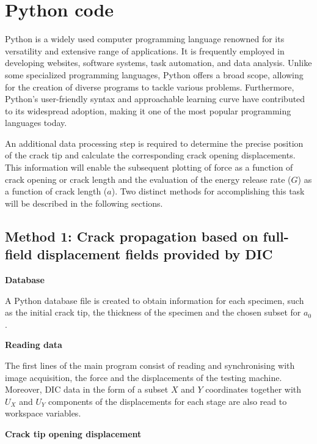 \section{Python code}

Python is a widely used computer programming language renowned for its versatility and extensive range of applications. It is frequently employed in developing websites, software systems, task automation, and data analysis. Unlike some specialized programming languages, Python offers a broad scope, allowing for the creation of diverse programs to tackle various problems. Furthermore, Python's user-friendly syntax and approachable learning curve have contributed to its widespread adoption, making it one of the most popular programming languages today.

An additional data processing step is required to determine the precise position of the crack tip and calculate the corresponding crack opening displacements. This information will enable the subsequent plotting of force as a function of crack opening or crack length and the evaluation of the energy release rate ($G$) as a function of crack length ($a$). Two distinct methods for accomplishing this task will be described in the following sections.

\subsection{Method 1: Crack propagation based on full-field displacement fields provided by DIC}

\textbf{Database}

A Python database file is created to obtain information for each specimen, such as the initial crack tip, the thickness of the specimen and the chosen subset for $a_0$.

\textbf{Reading data}

The first lines of the main program consist of reading and synchronising with image acquisition, the force and the displacements of the testing machine. Moreover, DIC data in the form of a subset $X$ and $Y$ coordinates together with $U_X$ and $U_Y$ components of the displacements for each stage are also read to workspace variables.

\textbf{Crack tip opening displacement}

